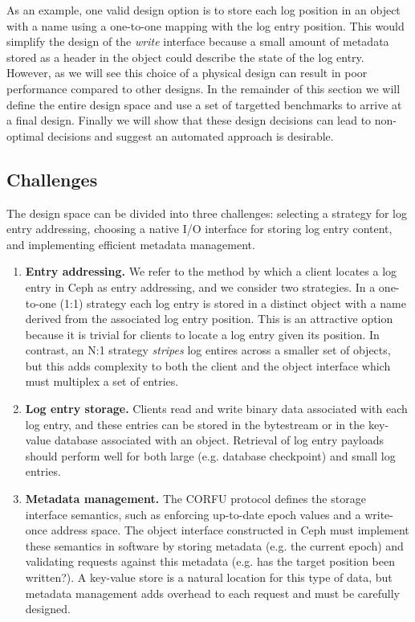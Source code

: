 \documentclass[10pt,twocolumn]{article}
\begin{document}
As an example, one valid design option is to store each log position in an
object with a name using a one-to-one mapping with the log entry position.
This would simplify the design of the \emph{write} interface because a small
amount of metadata stored as a header in the object could describe the state
of the log entry.  However, as we will see this choice of a physical design
can result in poor performance compared to other designs. In the remainder of
this section we will define the entire design space and use a set of targetted
benchmarks to arrive at a final design. Finally we will show that these design
decisions can lead to non-optimal decisions and suggest an automated approach
is desirable.

\subsection{Challenges}

The design space can be divided into three challenges: selecting a strategy
for log entry addressing, choosing a native I/O interface for storing log
entry content, and implementing efficient metadata management.

\begin{enumerate}
    \item {\bf Entry addressing.} We refer to the method by which a client
        locates a log entry in Ceph as entry addressing, and we consider two
        strategies. In a one-to-one (1:1) strategy each log entry is stored in
        a distinct object with a name derived from the associated log entry
        position. This is an attractive option because it is trivial for
        clients to locate a log entry given its position.  In contrast, an N:1
        strategy \emph{stripes} log entires across a smaller set of objects,
        but this adds complexity to both the client and the object interface which
        must multiplex a set of entries.

    \item {\bf Log entry storage.} Clients read and write binary data
        associated with each log entry, and these entries can be stored in the
        bytestream or in the key-value database associated with an object.
        Retrieval of log entry payloads should perform well for both large
        (e.g. database checkpoint) and small log entries.

    \item {\bf Metadata management.} The CORFU protocol defines the storage
        interface semantics, such as enforcing up-to-date epoch values and a
        write-once address space. The object interface constructed in Ceph must
        implement these semantics in software by storing metadata (e.g. the
        current epoch) and validating requests against this metadata (e.g. has
        the target position been written?). A key-value store is a natural
        location for this type of data, but metadata management adds overhead
        to each request and must be carefully designed.
\end{enumerate}
\end{document}
